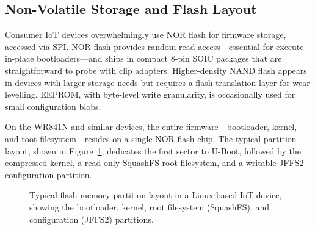 \subsection{Non-Volatile Storage and Flash Layout}\label{subsec:storage}

Consumer IoT devices overwhelmingly use NOR flash for firmware storage, accessed via SPI. NOR flash provides random read access---essential for execute-in-place bootloaders---and ships in compact 8-pin SOIC packages that are straightforward to probe with clip adapters. Higher-density NAND flash appears in devices with larger storage needs but requires a flash translation layer for wear levelling. EEPROM, with byte-level write granularity, is occasionally used for small configuration blobs.

On the WR841N and similar devices, the entire firmware---bootloader, kernel, and root filesystem---resides on a single NOR flash chip. The typical partition layout, shown in Figure~\ref{fig:flash-layout}, dedicates the first sector to U-Boot, followed by the compressed kernel, a read-only SquashFS root filesystem, and a writable JFFS2 configuration partition.

\begin{figure}[ht]
    \centering
    \caption{Typical flash memory partition layout in a Linux-based IoT device, showing the bootloader, kernel, root filesystem (SquashFS), and configuration (JFFS2) partitions.}
    \label{fig:flash-layout}
\end{figure}

